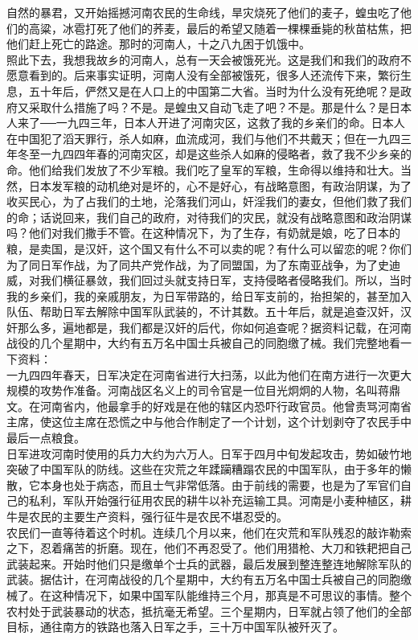 自然的暴君，又开始摇撼河南农民的生命线，旱灾烧死了他们的麦子，蝗虫吃了他们的高粱，冰雹打死了他们的荞麦，最后的希望又随着一棵棵垂毙的秋苗枯焦，把他们赶上死亡的路途。那时的河南人，十之八九困于饥饿中。\\

照此下去，我想我故乡的河南人，总有一天会被饿死光。这是我们和我们的政府不愿意看到的。后来事实证明，河南人没有全部被饿死，很多人还流传下来，繁衍生息，五十年后，俨然又是在人口上的中国第二大省。当时为什么没有死绝呢？是政府又采取什么措施了吗？不是。是蝗虫又自动飞走了吧？不是。那是什么？是日本人来了──一九四三年，日本人开进了河南灾区，这救了我的乡亲们的命。日本人在中国犯了滔天罪行，杀人如麻，血流成河，我们与他们不共戴天；但在一九四三年冬至一九四四年春的河南灾区，却是这些杀人如麻的侵略者，救了我不少乡亲的命。他们给我们发放了不少军粮。我们吃了皇军的军粮，生命得以维持和壮大。当然，日本发军粮的动机绝对是坏的，心不是好心，有战略意图，有政治阴谋，为了收买民心，为了占我们的土地，沦落我们河山，奸淫我们的妻女，但他们救了我们的命；话说回来，我们自己的政府，对待我们的灾民，就没有战略意图和政治阴谋吗？他们对我们撒手不管。在这种情况下，为了生存，有奶就是娘，吃了日本的粮，是卖国，是汉奸，这个国又有什么不可以卖的呢？有什么可以留恋的呢？你们为了同日军作战，为了同共产党作战，为了同盟国，为了东南亚战争，为了史迪威，对我们横征暴敛，我们回过头就支持日军，支持侵略者侵略我们。所以，当时我的乡亲们，我的亲戚朋友，为日军带路的，给日军支前的，抬担架的，甚至加入队伍、帮助日军去解除中国军队武装的，不计其数。五十年后，就是追查汉奸，汉奸那么多，遍地都是，我们都是汉奸的后代，你如何追查呢？据资料记载，在河南战役的几个星期中，大约有五万名中国士兵被自己的同胞缴了械。我们完整地看一下资料：\\

一九四四年春天，日军决定在河南省进行大扫荡，以此为他们在南方进行一次更大规模的攻势作准备。河南战区名义上的司令官是一位目光炯炯的人物，名叫蒋鼎文。在河南省内，他最拿手的好戏是在他的辖区内恐吓行政官员。他曾责骂河南省主席，使这位主席在恐慌之中与他合作制定了一个计划，这个计划剥夺了农民手中最后一点粮食。\\

日军进攻河南时使用的兵力大约为六万人。日军于四月中旬发起攻击，势如破竹地突破了中国军队的防线。这些在灾荒之年蹂躏糟蹋农民的中国军队，由于多年的懒散，它本身也处于病态，而且士气非常低落。由于前线的需要，也是为了军官们自己的私利，军队开始强行征用农民的耕牛以补充运输工具。河南是小麦种植区，耕牛是农民的主要生产资料，强行征牛是农民不堪忍受的。\\

农民们一直等待着这个时机。连续几个月以来，他们在灾荒和军队残忍的敲诈勒索之下，忍着痛苦的折磨。现在，他们不再忍受了。他们用猎枪、大刀和铁耙把自己武装起来。开始时他们只是缴单个士兵的武器，最后发展到整连整连地解除军队的武装。据估计，在河南战役的几个星期中，大约有五万名中国士兵被自己的同胞缴械了。在这种情况下，如果中国军队能维持三个月，那真是不可思议的事情。整个农村处于武装暴动的状态，抵抗毫无希望。三个星期内，日军就占领了他们的全部目标，通往南方的铁路也落入日军之手，三十万中国军队被歼灭了。\\

